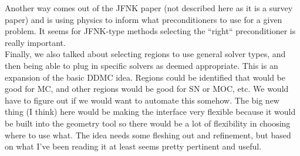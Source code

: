 \documentclass[12pt,twoside]{article}
\begin{document}
Another way comes out of the JFNK paper (not described here as it is a survey paper) and is using physics to inform what preconditioners to use for a given problem. It seems for JFNK-type methods selecting the ``right`` preconditioner is really important. \\

Finally, we also talked about selecting regions to use general solver types, and then being able to plug in specific solvers as deemed appropriate. This is an expansion of the basic DDMC idea. Regions could be identified that would be good for MC, and other regions would be good for SN or MOC, etc. We would have to figure out if we would want to automate this somehow. The big new thing (I think) here would be making the interface very flexible because it would be built into the geometry tool so there would be a lot of flexibility in choosing where to use what. The idea needs some fleshing out and refinement, but based on what I've been reading it at least seems pretty pertinent and useful. 
\end{document}
